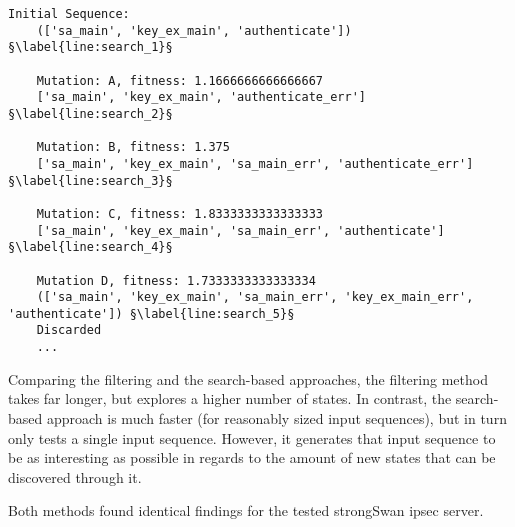 \begin{lstlisting}[float=h, caption=Search-based input sequence generation example mutations., label=lst:search, escapechar=§]
	Initial Sequence: 	
	(['sa_main', 'key_ex_main', 'authenticate']) §\label{line:search_1}§
	
	Mutation: A, fitness: 1.1666666666666667
	['sa_main', 'key_ex_main', 'authenticate_err'] §\label{line:search_2}§
	
	Mutation: B, fitness: 1.375
	['sa_main', 'key_ex_main', 'sa_main_err', 'authenticate_err'] §\label{line:search_3}§
	
	Mutation: C, fitness: 1.8333333333333333
	['sa_main', 'key_ex_main', 'sa_main_err', 'authenticate'] §\label{line:search_4}§
	
	Mutation D, fitness: 1.7333333333333334 
	(['sa_main', 'key_ex_main', 'sa_main_err', 'key_ex_main_err', 'authenticate']) §\label{line:search_5}§
	Discarded
	...
\end{lstlisting}

Comparing the filtering and the search-based approaches, the filtering method takes far longer, but explores a higher number of states. In contrast, the search-based approach is much faster (for reasonably sized input sequences), but in turn only tests a single input sequence. However, it generates that input sequence to be as interesting as possible in regards to the amount of new states that can be discovered through it.

Both methods found identical findings for the tested strongSwan \ac{ipsec} server.

